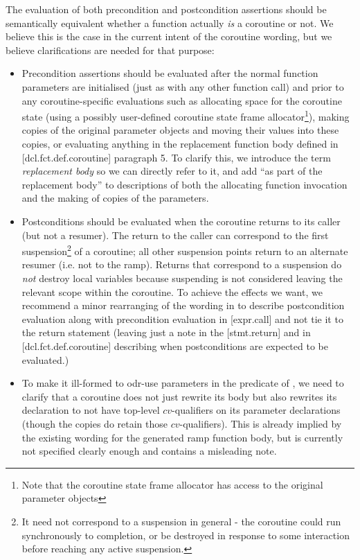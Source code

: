 The evaluation of both precondition and postcondition assertions should be semantically equivalent whether a function actually \emph{is} a coroutine or not.  We believe this is the case in the current intent of the coroutine wording, but we believe clarifications are needed for that purpose:
\begin{itemize}
\item Precondition assertions should be evaluated after the normal function parameters are initialised (just as with any other function call) and prior to any coroutine-specific evaluations such as allocating space for the coroutine state (using a possibly user-defined coroutine state frame allocator\footnote{Note that the coroutine state frame allocator has access to the original parameter objects}), making copies of the original parameter objects and moving their values into these copies, or evaluating anything in the replacement function body defined in [dcl.fct.def.coroutine] paragraph 5.  To clarify this, we  introduce the term \emph{replacement body} so we can directly refer to it, and add ``as part of the replacement body'' to descriptions of both the allocating function invocation and the making of copies of the parameters.
\item Postconditions should be evaluated when the coroutine returns to its caller (but not a resumer).  The return to the caller can correspond to the first suspension\footnote{It need not correspond to a suspension in general - the coroutine could run synchronously to completion, or be destroyed in response to some interaction before reaching any active suspension.} of a coroutine; all other suspension points return to an alternate resumer (i.e. not to the ramp).   Returns that correspond to a suspension do \emph{not} destroy local variables because suspending is not considered leaving the relevant scope within the coroutine.   To achieve the effects we want, we recommend a minor rearranging of the wording in \cite{P2900R8} to describe postcondition evaluation along with precondition evaluation in [expr.call] and not tie it to the return statement (leaving just a note in the [stmt.return] and in [dcl.fct.def.coroutine] describing when postconditions are expected to be evaluated.)
\item To make it ill-formed to odr-use parameters in the predicate of , we need to clarify that a coroutine does not just rewrite its body but also rewrites its declaration to not have top-level $cv$-qualifiers on its parameter declarations (though the copies do retain those $cv$-qualifiers).  This is already implied by the existing wording for the generated ramp function body, but is currently not specified clearly enough and contains a misleading note.
\end{itemize}

